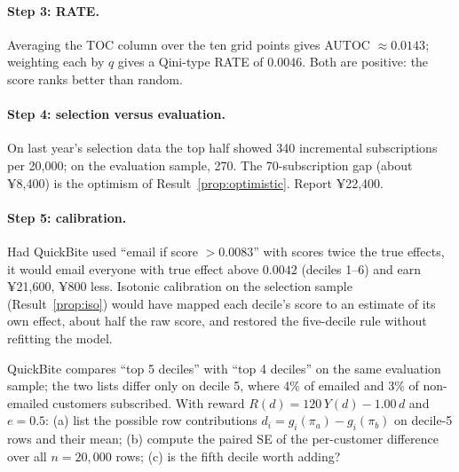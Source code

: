 \documentclass[11pt]{article}
\begin{document}
\paragraph{Step 3: RATE.} Averaging the TOC column over the ten grid points gives AUTOC $\approx 0.0143$; weighting each by
$q$ gives a Qini-type RATE of $0.0046$. Both are positive: the score ranks better than random.

\paragraph{Step 4: selection versus evaluation.} On last year's selection data the top half showed 340 incremental
subscriptions per 20{,}000; on the evaluation sample, 270. The 70-subscription gap (about ¥8{,}400) is the optimism of
Result~\ref{prop:optimistic}. Report ¥22{,}400.

\paragraph{Step 5: calibration.} Had QuickBite used ``email if score $> 0.0083$'' with scores twice the true effects, it
would email everyone with true effect above $0.0042$ (deciles 1--6) and earn ¥21{,}600, ¥800 less. Isotonic calibration on
the selection sample (Result~\ref{prop:iso}) would have mapped each decile's score to an estimate of its own effect, about
half the raw score, and restored the five-decile rule without refitting the model.

\begin{exercise}[computation]
QuickBite compares ``top 5 deciles'' with ``top 4 deciles'' on the same evaluation sample; the two lists differ only on
decile 5, where 4\% of emailed and 3\% of non-emailed customers subscribed. With reward $R(d) = 120\,Y(d) - 1.00\,d$ and
$e = 0.5$: (a) list the possible row contributions $d_i = g_i(\pi_a) - g_i(\pi_b)$ on decile-5 rows and their mean;
(b) compute the paired SE of the per-customer difference over all $n = 20{,}000$ rows; (c) is the fifth decile worth
adding?
\end{exercise}
\end{document}
